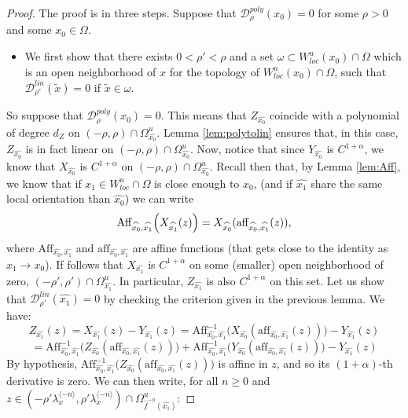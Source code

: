 \documentclass[a4paper]{article}
\theoremstyle{definition}
\begin{document}
\begin{proof}
The proof is in three steps. Suppose that $\mathcal{D}_\rho^{poly}(x_0)=0$ for some $\rho>0$ and some $x_0 \in \Omega$.
\begin{itemize}
\item We first show that there exists $0 < \rho' < \rho$ and a set $\omega \subset W^u_{loc}(x_0) \cap \Omega$ which is an open neighborhood of $x$ for the topology of $W^u_{loc}(x_0) \cap \Omega$, such that $\mathcal{D}_{\rho'}^{lin}(\tilde{x})=0$ if $\tilde{x} \in \omega$. 
\end{itemize}
So suppose that $\mathcal{D}_\rho^{poly}(x_0)=0$. This means that $Z_{\widehat{x_0}}$ coincide with a polynomial of degree $d_Z$ on $(-\rho,\rho) \cap \Omega_{\widehat{x_0}}^u$. Lemma \ref{lem:polytolin} ensures that, in this case, $Z_{\widehat{x_0}}$ is in fact linear on $(-\rho,\rho) \cap \Omega_{\widehat{x_0}}^u$. Now, notice that since $Y_{\widehat{x_0}}$ is $C^{1+\alpha}$, we know that $X_{\widehat{x_0}}$ is $C^{1+\alpha}$ on $(-\rho,\rho) \cap \Omega_{\widehat{x_0}}^u$. Recall then that, by Lemma \ref{lem:Aff}, we know that if $x_1 \in W^u_{loc} \cap \Omega$ is close enough to $x_0$, (and if $\widehat{x_1}$ share the same local orientation than $\widehat{x_0}$) we can write
$$ \text{Aff}_{\widehat{x_0},\widehat{x_1}}\Big(X_{\widehat{x_1}}(z)\Big{)} = X_{\widehat{x_0}}(\text{aff}_{\widehat{x_0},\widehat{x_1}}(z)), $$
where $\text{Aff}_{\widehat{x_0},\widehat{x_1}}$ and $\text{aff}_{\widehat{x_0},\widehat{x_1}}$ are affine functions (that gets close to the identity as $x_1 \rightarrow x_0$). If follows that $X_{\widehat{x_1}}$ is $C^{1+\alpha}$ on some (smaller) open neighborhood of zero, $(-\rho',\rho') \cap \Omega_{\widehat{x_1}}^u$. In particular, $Z_{\widehat{x_1}}$ is also $C^{1+\alpha}$ on this set. Let us show that $\mathcal{D}_{\rho'}^{lin}(\widehat{x_1})=0$ by checking the criterion given in the previous lemma. We have:
$$ Z_{\widehat{x_1}}(z) = X_{\widehat{x_1}}(z) - Y_{\widehat{x_1}}(z) = \text{Aff}_{\widehat{x_0},\widehat{x_1}}^{-1} \Big( X_{\widehat{x_0}}(\text{aff}_{\widehat{x_0},\widehat{x_1}}(z))  \Big) - Y_{\widehat{x_1}}(z) $$
$$ = \text{Aff}_{\widehat{x_0},\widehat{x_1}}^{-1} \Big( Z_{\widehat{x_0}}(\text{aff}_{\widehat{x_0},\widehat{x_1}}(z))  \Big) + \text{Aff}_{\widehat{x_0},\widehat{x_1}}^{-1} \Big( Y_{\widehat{x_0}}(\text{aff}_{\widehat{x_0},\widehat{x_1}}(z))  \Big) - Y_{\widehat{x_1}}(z) $$
By hypothesis, $\text{Aff}_{\widehat{x_0},\widehat{x_1}}^{-1} \Big( Z_{\widehat{x_0}}(\text{aff}_{\widehat{x_0},\widehat{x_1}}(z))  \Big)$ is affine in $z$, and so its $(1+\alpha)$-th derivative is zero. We can then write, for all $n\geq 0$ and $z \in (-\rho' \lambda_x^{\langle -n \rangle},\rho' \lambda_x^{\langle -n \rangle}) \cap \Omega_{\widehat{f}^{-n}(\widehat{x_1})}^u$:

\end{proof}
\end{document}
